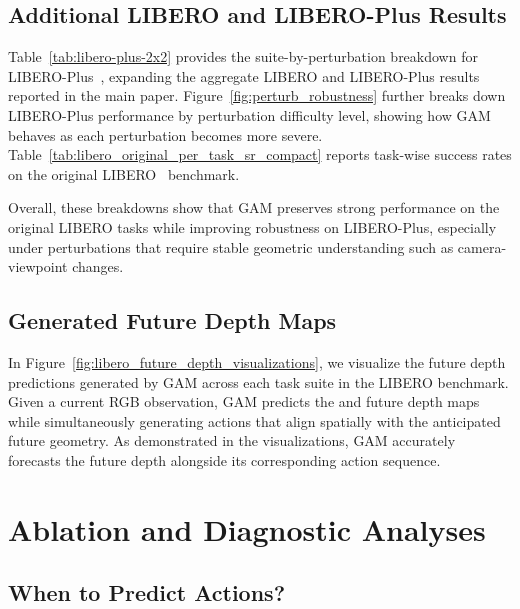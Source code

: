 
\subsection{Additional LIBERO and LIBERO-Plus Results}
\label{sec:appendix-additional_libero}





Table~\ref{tab:libero-plus-2x2} provides the suite-by-perturbation breakdown for LIBERO-Plus~\cite{fei2025libero}, expanding the aggregate LIBERO and LIBERO-Plus results reported in the main paper. Figure~\ref{fig:perturb_robustness} further breaks down LIBERO-Plus performance by perturbation difficulty level, showing how GAM behaves as each perturbation becomes more severe. Table~\ref{tab:libero_original_per_task_sr_compact} reports task-wise success rates on the original LIBERO~\cite{liu2023libero} benchmark.

Overall, these breakdowns show that GAM preserves strong performance on the original LIBERO tasks while improving robustness on LIBERO-Plus, especially under perturbations that require stable geometric understanding such as camera-viewpoint changes.

\subsection{Generated Future Depth Maps}
\label{sec:appendix-generated_depth}


In Figure~\ref{fig:libero_future_depth_visualizations}, we visualize the future depth predictions generated by GAM across each task suite in the LIBERO benchmark. Given a current RGB observation, GAM predicts the and future depth maps while simultaneously generating actions that align spatially with the anticipated future geometry. As demonstrated in the visualizations, GAM accurately forecasts the future depth alongside its corresponding action sequence.


\clearpage
\section{Ablation and Diagnostic Analyses}
\label{sec:appendix-ablation_analysis}


\subsection{When to Predict Actions?}
\label{sec:appendix-layer_ablation}


